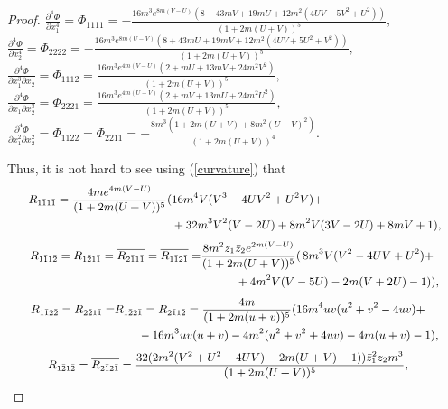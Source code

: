 \documentclass[11pt, reqno]{amsart}
\begin{document}
\begin{proof}
$\frac{\partial^4\Phi}{\partial x_1^4}=\Phi_{1111}=-\frac{16m^3e^{8m(V-U)} \left(8+43mV+19mU+12m^2\left(4UV+5V^2+U^2\right)\right)}{(1+2m(U+V))^5},$
\vskip 0.1cm
$\frac{\partial^4\Phi}{\partial x_2^4}=\Phi_{2222}=-\frac{16m^3e^{8m(U-V)}\left(8+43mU+19mV+12m^2\left(4UV+5U^2+V^2\right)\right)}{(1+2m(U+V))^5},$
\vskip 0.1cm
$\frac{\partial^4\Phi}{\partial x_1^3\partial x_2}=\Phi_{1112}=\frac{16m^3e^{4m(V-U)}\left(2+mU+13mV+24m^2V^2\right)}{(1+2m(U+V))^5},$
\vskip 0.1cm
$\frac{\partial^4\Phi}{\partial x_1\partial x_2^3}=\Phi_{2221}=\frac{16m^3e^{4m(U-V)}\left(2+mV+13mU+24m^2U^2\right)}{(1+2m(U+V))^5},$
\vskip 0.1cm
$\frac{\partial^4\Phi}{\partial x_1^2\partial x_2^2}=\Phi_{1122}=\Phi_{2211}=-\frac{8m^3 \left(1+2m(U+V)+8m^2(U-V)^2\right)}{(1+2m(U+V))^4}.$

\vskip 0.1cm
Thus, it is not hard to see using  (\ref{curvature}) that
\begin{equation}
{\small \begin{split}
R_{1\bar 1 1\bar 1}=\frac{4 me^{4m(V-U)}}{(1+2m(U+V))^5} (&16m^4V(V^3-4UV^2+U^2V)+\\
&+32m^3V^2(V-2U)+8m^2V(3V-2U)+8mV+1),
\end{split}\nonumber}
\end{equation}
\begin{equation}
{\small\begin{split}
R_{1\bar 1 1\bar 2}=R_{1\bar 2 1\bar 1}=\overline{R_{2\bar 1 1\bar 1}}=\overline{R_{1\bar 1 2\bar 1}}=&\frac{8m^2z_1\bar z_2e^{2m(V-U)}}{(1+2m(U+V))^5}(\, 8m^3V(V^2-4UV+U^2)+\\
&\qquad\quad+4m^2V(V-5U)-2m(V+2U)-1)),
\end{split} \nonumber}
\end{equation}
\begin{equation}
{\small \begin{split}
R_{1\bar 1 2\bar 2}=R_{2\bar 2 1\bar 1}=&{R_{1\bar 2 2\bar 1}}={R_{2\bar 1 1\bar 2}}=\frac{4 m}{(1+2m(u+v))^5}(16m^4uv(u^2+v^2-4uv)+\\
&\quad \quad -16m^3uv (u+v)-4m^2(u^2+v^2+4uv)-4m(u+v)-1),
\end{split} \nonumber}
\end{equation}
\begin{equation}
\small\begin{split}
R_{1\bar 2 1\bar 2}&=\overline{R_{2\bar 1 2\bar 1}}=\frac{32(2m^2(V^2+U^2-4UV)-2m(U+V)-1))\bar z_1^2z_2m^3}{(1+2m(U+V))^5},
\end{split} \nonumber
\end{equation}
\begin{equation}

\end{equation}
\end{proof}
\end{document}
